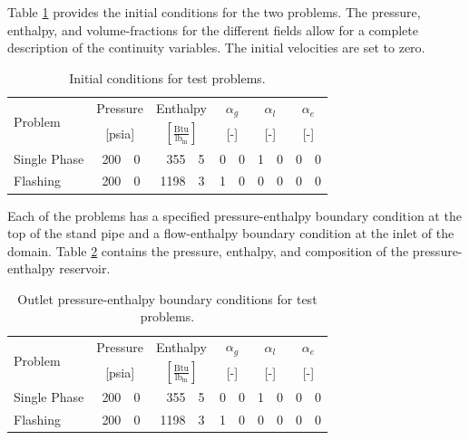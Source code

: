 Table \ref{tab:ic} provides the initial conditions for the two problems.
The pressure, enthalpy, and volume-fractions for the different fields allow for a complete description of the continuity variables.
The initial velocities are set to zero.

\begin{table}[ht]
\centering
\begin{tabular}{@{}lr@{.}lr@{.}lr@{.}lr@{.}lr@{.}l@{}} \toprule
\multirow{2}{*}{Problem} & \multicolumn{2}{c}{Pressure} & \multicolumn{2}{c}{Enthalpy}             & \multicolumn{2}{c}{$\alpha_g$} & \multicolumn{2}{c}{$\alpha_l$} & \multicolumn{2}{c}{$\alpha_e$} \\ 
                         & \multicolumn{2}{c}{[psia]} & \multicolumn{2}{c}{$[\frac{\text{Btu}}{\text{lb}_{\text{m}}}]$} & \multicolumn{2}{c}{[-]}      & \multicolumn{2}{c}{[-]}      & \multicolumn{2}{c}{[-]}      \\ \midrule
Single Phase             &  200&0                       &  355&5                                   & 0&0                            & 1&0                            & 0&0 \\
Flashing                 &  200&0                       & 1198&3                                   & 1&0                            & 0&0                            & 0&0 \\ \bottomrule  
\end{tabular}
\caption{Initial conditions for test problems.}
\label{tab:ic}
\end{table}

Each of the problems has a specified pressure-enthalpy boundary condition at the top of the stand pipe and a flow-enthalpy boundary condition at the inlet of the domain.
Table \ref{tab:bc_pe} contains the pressure, enthalpy, and composition of the pressure-enthalpy reservoir. 

\begin{table}[ht]
\centering
\begin{tabular}{@{}lr@{.}lr@{.}lr@{.}lr@{.}lr@{.}l@{}} \toprule
\multirow{2}{*}{Problem} & \multicolumn{2}{c}{Pressure} & \multicolumn{2}{c}{Enthalpy}             & \multicolumn{2}{c}{$\alpha_g$} & \multicolumn{2}{c}{$\alpha_l$} & \multicolumn{2}{c}{$\alpha_e$} \\ 
                         & \multicolumn{2}{c}{[psia]} & \multicolumn{2}{c}{$[\frac{\text{Btu}}{\text{lb}_{\text{m}}}]$} & \multicolumn{2}{c}{[-]}      & \multicolumn{2}{c}{[-]}      & \multicolumn{2}{c}{[-]}      \\ \midrule
Single Phase             &  200&0                       &  355&5                                   & 0&0                            & 1&0                            & 0&0 \\
Flashing                 &  200&0                       & 1198&3                                   & 1&0                            & 0&0                            & 0&0 \\ \bottomrule  
\end{tabular}
\caption{Outlet pressure-enthalpy boundary conditions for test problems.}
\label{tab:bc_pe}
\end{table}

